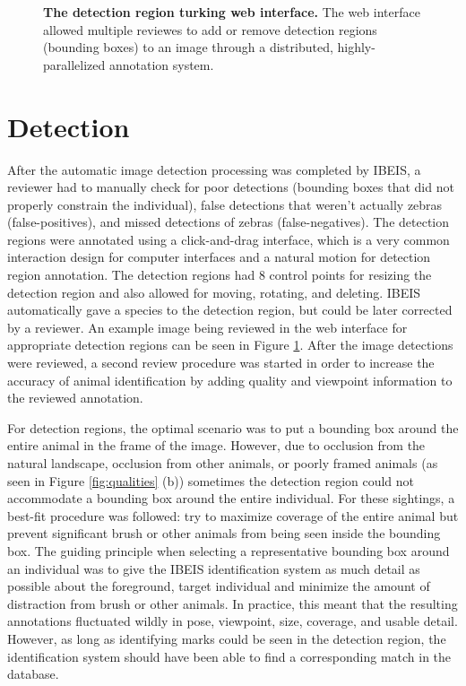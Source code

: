 \begin{figure}[t]%
	\centering
    	\caption[The Detection Region Turking Web Interface]{\textbf{The detection region turking web interface.}  The web interface allowed multiple reviewes to add or remove detection regions (bounding boxes) to an image through a distributed, highly-parallelized annotation system.}
    	\label{fig:turking_interface_detection}
\end{figure}

\section{Detection}
After the automatic image detection processing was completed by IBEIS, a reviewer had to manually check for poor detections (bounding boxes that did not properly constrain the individual), false detections that weren't actually zebras (false-positives), and missed detections of zebras (false-negatives).  The detection regions were annotated using a click-and-drag interface, which is a very common interaction design for computer interfaces and a natural motion for detection region annotation.  The detection regions had 8 control points for resizing the detection region and also allowed for moving, rotating, and deleting.  IBEIS automatically gave a species to the detection region, but could be later corrected by a reviewer.  An example image being reviewed in the web interface for appropriate detection regions can be seen in Figure \ref{fig:turking_interface_detection}.  After the image detections were reviewed, a second review procedure was started in order to increase the accuracy of animal identification by adding quality and viewpoint information to the reviewed annotation.

For detection regions, the optimal scenario was to put a bounding box around the entire animal in the frame of the image.  However, due to occlusion from the natural landscape, occlusion from other animals, or poorly framed animals (as seen in Figure \ref{fig:qualities} (b)) sometimes the detection region could not accommodate a bounding box around the entire individual.  For these sightings, a best-fit procedure was followed: try to maximize coverage of the entire animal but prevent significant brush or other animals from being seen inside the bounding box.  The guiding principle when selecting a representative bounding box around an individual was to give the IBEIS identification system as much detail as possible about the foreground, target individual and minimize the amount of distraction from brush or other animals.  In practice, this meant that the resulting annotations fluctuated wildly in pose, viewpoint, size, coverage, and usable detail.  However, as long as identifying marks could be seen in the detection region, the identification system should have been able to find a corresponding match in the database.

